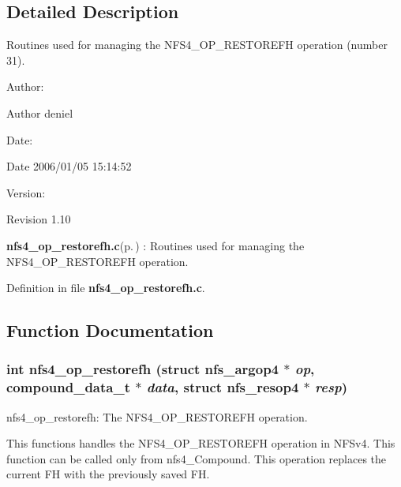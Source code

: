 \subsection{Detailed Description}
Routines used for managing the NFS4\_\-OP\_\-RESTOREFH operation (number 31). 

\begin{Desc}
\item[Author:]\begin{Desc}
\item[Author]deniel \end{Desc}
\end{Desc}
\begin{Desc}
\item[Date:]\begin{Desc}
\item[Date]2006/01/05 15:14:52 \end{Desc}
\end{Desc}
\begin{Desc}
\item[Version:]\begin{Desc}
\item[Revision]1.10 \end{Desc}
\end{Desc}
{\bf nfs4\_\-op\_\-restorefh.c}{\rm (p.\,\pageref{nfs4__op__restorefh_8c})} : Routines used for managing the NFS4\_\-OP\_\-RESTOREFH operation.

Definition in file {\bf nfs4\_\-op\_\-restorefh.c}.

\subsection{Function Documentation}
\subsubsection{\setlength{\rightskip}{0pt plus 5cm}int nfs4\_\-op\_\-restorefh (struct nfs\_\-argop4 $\ast$ {\em op}, compound\_\-data\_\-t $\ast$ {\em data}, struct nfs\_\-resop4 $\ast$ {\em resp})}\label{nfs4__op__restorefh_8c_a0}


nfs4\_\-op\_\-restorefh: The NFS4\_\-OP\_\-RESTOREFH operation.

This functions handles the NFS4\_\-OP\_\-RESTOREFH operation in NFSv4. This function can be called only from nfs4\_\-Compound. This operation replaces the current FH with the previously saved FH.

